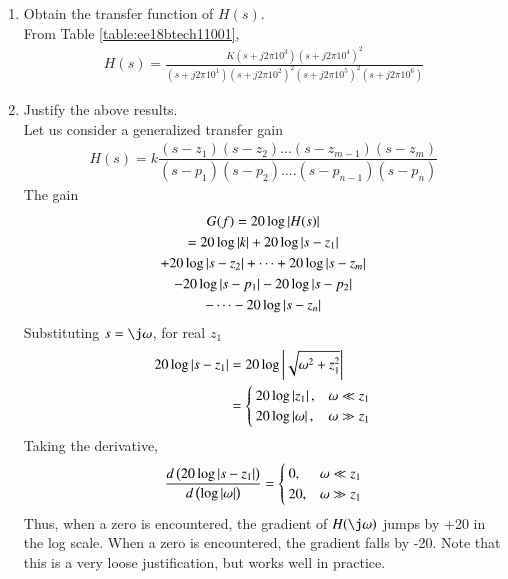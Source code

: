 \begin{enumerate}[label=\thesection.\arabic*.,ref=\thesection.\theenumi]

\item Obtain the transfer function of $H(s)$.
\\
\solution From Table \ref{table:ee18btech11001},
{\footnotesize
\begin{align}
\label{eq:ee18btech11001_system}
	H(s) = \frac{K(s+j2\pi 10^{3})(s+j2\pi 10^{4})^{2}}{(s+j2\pi 10^{1})(s+j2\pi 10^{2})^{2}(s+j2\pi 10^{5})^{2}(s+j2\pi 10^{6})}
\end{align}
}
\item Justify the above results.
\\
\solution
Let us consider a generalized transfer gain
\begin{align}
	H(s) = k \dfrac{(s-z_{1})(s-z_{2})...(s-z_{m-1})(s-z_{m})}{(s-p_{1})(s-p_{2})....(s-p_{n-1})(s-p_{n})}
\end{align}
The gain
\begin{multline}
	G(f) = 20\log\left\vert H(s)\right\vert 
\\
= 20\log \left\vert k\right\vert + 20\log \left\vert s-z_{1}\right\vert 
	    \\
	    + 20\log \left\vert s-z_{2}\right\vert + \dots + 20\log \left\vert s-z_{m}\right\vert 
\\
- 20\log \left\vert s-p_{1}\right\vert 
	    - 20\log \left\vert s-p_{2}\right\vert 
	    \\
- \dots - 20\log \left\vert s-z_{n}\right\vert 
\end{multline}
%
Substituting $s = \j \omega$, for real $z_1$
\begin{align}
	20\log \left\vert s-z_{1}\right\vert &= 20\log \left\vert\sqrt{\omega^{2} + z_{1}^{2}}\right\vert
\\
&= 
\begin{cases}
20 \log \left\vert z_{1}\right\vert, & \omega \ll z_{1}
\\
20 \log \left\vert\omega\right\vert, & \omega \gg z_{1}
\end{cases}
\end{align}
%
Taking the derivative, 
\begin{align}
	\frac{d\left(20\log \left\vert s-z_{1}\right\vert\right)}{d\left(\log \left\vert\omega\right\vert\right)} 
= 
\begin{cases}
0, & \omega \ll z_{1}
\\
20, & \omega \gg z_{1}
\end{cases}
\end{align}
%
Thus, when a zero is encountered, the gradient of $H(\j\omega)$ jumps by +20 in the log scale.  When a zero is encountered, the gradient falls by -20. Note that this is a very loose justification, but works well in practice.


\end{enumerate}
